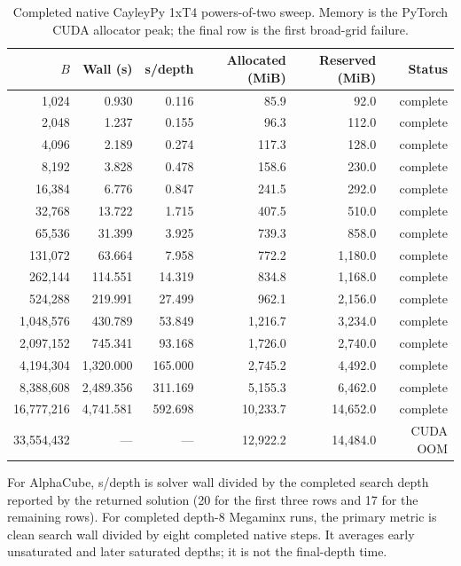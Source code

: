 \documentclass[10pt,twocolumn]{article}
\begin{document}
\begin{table}[t]
\centering
\small
\setlength{\tabcolsep}{4pt}
\caption{Completed native CayleyPy 1xT4 powers-of-two sweep. Memory is the
PyTorch CUDA allocator peak; the final row is the first broad-grid failure.}
\label{tab:cayleypy_curve}
\begin{tabular}{@{}rrrrrr@{}}
\toprule
$B$ & Wall (s) & s/depth & Allocated (MiB) & Reserved (MiB) & Status \\
\midrule
1,024 & 0.930 & 0.116 & 85.9 & 92.0 & complete \\
2,048 & 1.237 & 0.155 & 96.3 & 112.0 & complete \\
4,096 & 2.189 & 0.274 & 117.3 & 128.0 & complete \\
8,192 & 3.828 & 0.478 & 158.6 & 230.0 & complete \\
16,384 & 6.776 & 0.847 & 241.5 & 292.0 & complete \\
32,768 & 13.722 & 1.715 & 407.5 & 510.0 & complete \\
65,536 & 31.399 & 3.925 & 739.3 & 858.0 & complete \\
131,072 & 63.664 & 7.958 & 772.2 & 1,180.0 & complete \\
262,144 & 114.551 & 14.319 & 834.8 & 1,168.0 & complete \\
524,288 & 219.991 & 27.499 & 962.1 & 2,156.0 & complete \\
1,048,576 & 430.789 & 53.849 & 1,216.7 & 3,234.0 & complete \\
2,097,152 & 745.341 & 93.168 & 1,726.0 & 2,740.0 & complete \\
4,194,304 & 1,320.000 & 165.000 & 2,745.2 & 4,492.0 & complete \\
8,388,608 & 2,489.356 & 311.169 & 5,155.3 & 6,462.0 & complete \\
16,777,216 & 4,741.581 & 592.698 & 10,233.7 & 14,652.0 & complete \\
33,554,432 & --- & --- & 12,922.2 & 14,484.0 & CUDA OOM \\
\bottomrule
\end{tabular}
\end{table}

For AlphaCube, s/depth is solver wall divided by the completed search depth
reported by the returned solution (20 for the first three rows and 17 for the
remaining rows). For completed depth-8 Megaminx runs, the primary metric is
clean search wall divided by eight completed native steps. It averages early
unsaturated and later saturated depths; it is not the final-depth time.
\end{document}

